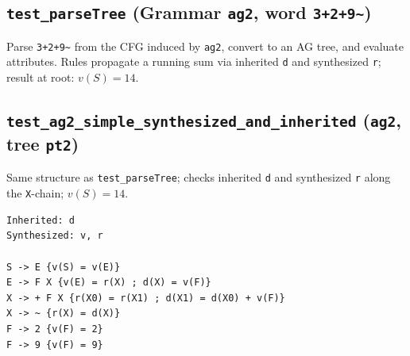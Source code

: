 \vspace{1cm}

\subsection{\texttt{test\_parseTree} (Grammar \texttt{ag2}, word \texttt{3+2+9\textasciitilde})}
Parse \texttt{3+2+9\textasciitilde} from the CFG induced by \texttt{ag2}, convert to an AG tree, and evaluate attributes. Rules propagate a running sum via inherited \texttt{d} and synthesized \texttt{r}; result at root: \(v(S)=14\). 

\subsection{\texttt{test\_ag2\_simple\_synthesized\_and\_inherited} (\texttt{ag2}, tree \texttt{pt2})}
 Same structure as \texttt{test\_parseTree}; checks inherited \texttt{d} and synthesized \texttt{r} along the \texttt{X}-chain; \(v(S)=14\). 

\begin{verbatim}
Inherited: d
Synthesized: v, r

S -> E {v(S) = v(E)}
E -> F X {v(E) = r(X) ; d(X) = v(F)}
X -> + F X {r(X0) = r(X1) ; d(X1) = d(X0) + v(F)}
X -> ~ {r(X) = d(X)}
F -> 2 {v(F) = 2}
F -> 9 {v(F) = 9}
\end{verbatim}



